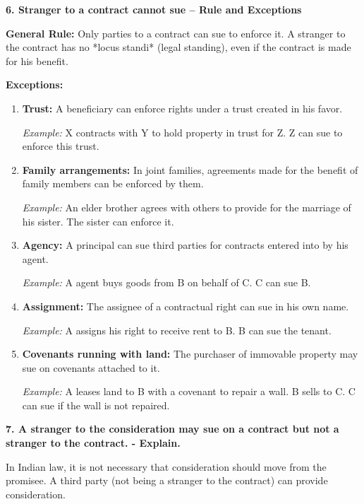\documentclass[12pt,a4paper]{book}
\begin{document}
\vspace{0.5cm}

\textbf{6. Stranger to a contract cannot sue – Rule and Exceptions}

\textbf{General Rule:}  
Only parties to a contract can sue to enforce it. A stranger to the contract has no *locus standi* (legal standing), even if the contract is made for his benefit.

\textbf{Exceptions:}
\begin{enumerate}
    \item \textbf{Trust:} A beneficiary can enforce rights under a trust created in his favor.

    \textit{Example:} X contracts with Y to hold property in trust for Z. Z can sue to enforce this trust.

    \item \textbf{Family arrangements:} In joint families, agreements made for the benefit of family members can be enforced by them.

    \textit{Example:} An elder brother agrees with others to provide for the marriage of his sister. The sister can enforce it.

    \item \textbf{Agency:} A principal can sue third parties for contracts entered into by his agent.

    \textit{Example:} A agent buys goods from B on behalf of C. C can sue B.

    \item \textbf{Assignment:} The assignee of a contractual right can sue in his own name.

    \textit{Example:} A assigns his right to receive rent to B. B can sue the tenant.

    \item \textbf{Covenants running with land:} The purchaser of immovable property may sue on covenants attached to it.

    \textit{Example:} A leases land to B with a covenant to repair a wall. B sells to C. C can sue if the wall is not repaired.
\end{enumerate}

\vspace{0.5cm}
\textbf{7. A stranger to the consideration may sue on a contract but not a stranger to the contract. - Explain.}

In Indian law, it is not necessary that consideration should move from the promisee. A third party (not being a stranger to the contract) can provide consideration.
\end{document}
